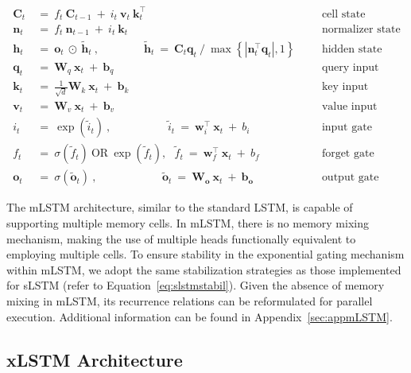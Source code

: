 \begin{align}
\label{eq:mlstm_recurrent_begin}
\mathbf{C}_t \ &= \  f_t \ \mathbf{C}_{t-1} \ + \ 
  i_t \ \mathbf{v}_t \ \mathbf{k}_t^\top & &  &\text{cell state} \\
\mathbf{n}_t \ &= \  f_t \ \mathbf{n}_{t-1} \ + \ 
  i_t \ \mathbf{k}_t & &  &\text{normalizer state} \\
\mathbf{h}_t  \ &= \ \mathbf{o}_t \ \odot \ \tilde{\mathbf{h}}_t
\ , \qquad \qquad 
\tilde{\mathbf{h}}_t \ = \   \mathbf{C}_t \mathbf{q}_t \ / \ 
  \max \left\{ |\mathbf{n}_t^\top \mathbf{q}_t|, 1 \right\} 
   &&&\text{hidden state} \\
\mathbf{q}_t \ &= \ \mathbf{W}_q \ \mathbf{x}_t \ + \ \mathbf{b}_q  & &  &\text{query input} \\
\mathbf{k}_t \ &= \ \frac{1}{\sqrt{d}} \mathbf{W}_k \ \mathbf{x}_t \ + \ \mathbf{b}_k  & &  &\text{key input} \\
\mathbf{v}_t \ &= \ \mathbf{W}_v \ \mathbf{x}_t \ + \ \mathbf{b}_v  & &  &\text{value input} \\
i_t \ &= \ \!\exp \!  \! \left( \tilde{i}_t  \right) \ , 
 \qquad \qquad \ \ \ \ \,
  \tilde{i}_t \ = \ \mathbf{w}^\top_{i} \ \mathbf{x}_t \ + \  b_{i} \ \ \ 
  &&&\text{input gate} \\
f_t \ &= \ \sigma \!  \left(  \tilde{f}_t \right) \ \text{OR} \ \!\exp \!  \! \left(  \tilde{f}_t \right) , \ \ \: \!
\tilde{f}_t \ = \ \mathbf{w}^\top_{f} \ \mathbf{x}_t  \ + \
  b_{f}
  &&& \text{forget gate} \\
\label{eq:mlstm_recurrent_end}
\mathbf{o}_t \ &= \ \sigma \left( \tilde{\mathbf{o}}_t \right) \ , \qquad \qquad \quad \ \ \ \,
  \tilde{\mathbf{o}}_t  \ = \ \mathbf{W}_{\mathbf{o}} \ \mathbf{x}_t \ + \
  \mathbf{b}_{\mathbf{o}}
  &&&\text{output gate} 
\end{align}

The mLSTM architecture, similar to the standard LSTM, is capable of supporting multiple memory cells. In mLSTM, there is no memory mixing mechanism, making the use of multiple heads functionally equivalent to employing multiple cells. To ensure stability in the exponential gating mechanism within mLSTM, we adopt the same stabilization strategies as those implemented for sLSTM (refer to Equation~\ref{eq:slstmstabil}). Given the absence of memory mixing in mLSTM, its recurrence relations can be reformulated for parallel execution. Additional information can be found in Appendix~\ref{sec:appmLSTM}.

\subsection{xLSTM Architecture}
\label{sec:xLSTMarch}

